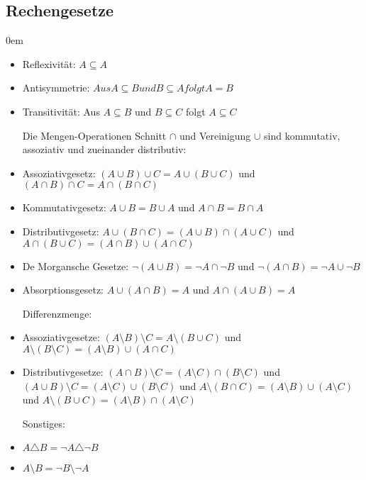 \documentclass[11pt]{article}
\begin{document}
\subsection{Rechengesetze}\itemsep0em\small
\begin{itemize}
\item Reflexivit{\"a}t: $A\subseteq A$
\item Antisymmetrie: $Aus A\subseteq B und B\subseteq A folgt A = B$
\item Transitivit{\"a}t: Aus $A\subseteq B$ und $B\subseteq C$ folgt $A\subseteq C$

Die Mengen-Operationen Schnitt $\cap$ und Vereinigung $\cup$ sind kommutativ, assoziativ und zueinander distributiv:
\item Assoziativgesetz: $\left( A \cup B \right) \cup C = A \cup \left( B \cup C \right)$ und $\left( A \cap B \right) \cap C = A \cap \left( B \cap C \right)$
\item Kommutativgesetz: $A \cup B = B \cup A$ und $A \cap B = B \cap A$
\item Distributivgesetz: $A \cup \left( B \cap C \right) = \left( A \cup B \right) \cap \left( A \cup C \right)$ und $A \cap \left( B \cup C \right) = \left( A \cap B \right) \cup \left( A \cap C \right)$
\item De Morgansche Gesetze: $\neg \left( A \cup B \right) = \neg A \cap \neg B$ und $\neg \left( A \cap B \right) = \neg A \cup \neg B$
\item Absorptionsgesetz: $A \cup \left( A \cap B \right) =A$ und $A \cap \left( A \cup B \right) = A$

Differenzmenge:
\item Assoziativgesetze: $(A \setminus B) \setminus C = A \setminus (B \cup C)$ und $A \setminus (B \setminus C) = (A \setminus B) \cup (A \cap C)$
\item Distributivgesetze: $(A \cap B) \setminus C = (A \setminus C) \cap (B \setminus C)$ und $(A \cup B) \setminus C = (A \setminus C) \cup (B \setminus C)$ und $A \setminus (B \cap C) = (A \setminus B) \cup (A \setminus C)$ und $A \setminus (B \cup C) = (A \setminus B) \cap (A \setminus C)$ 

Sonstiges:
\item $A \triangle B = \neg A \triangle \neg B$
\item $A \setminus B = \neg B \setminus \neg A$
\end{itemize}  \normalsize
\end{document}
